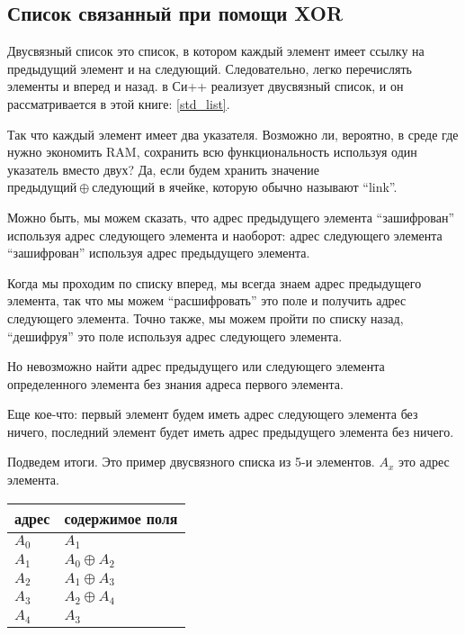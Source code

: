 \subsection{Список связанный при помощи XOR}

Двусвязный список это список, в котором каждый элемент имеет ссылку на предыдущий элемент и на следующий.
Следовательно, легко перечислять элементы и вперед и назад.
 в Си++ реализует двусвязный список, и он рассматривается в этой книге: \ref{std_list}.

Так что каждый элемент имеет два указателя.
Возможно ли, вероятно, в среде где нужно экономить \ac{RAM}, сохранить всю функциональность используя один указатель
вместо двух?
Да, если будем хранить значение $предыдущий \oplus следующий$ в ячейке, которую обычно называют ``link''.

Можно быть, мы можем сказать, что адрес предыдущего элемента ``зашифрован'' используя адрес следующего элемента и наоборот:
адрес следующего элемента ``зашифрован'' используя адрес предыдущего элемента.

Когда мы проходим по списку вперед, мы всегда знаем адрес предыдущего элемента, так что мы можем ``расшифровать'' это поле
и получить адрес следующего элемента.
Точно также, мы можем пройти по списку назад, ``дешифруя'' это поле используя адрес следующего элемента.

Но невозможно найти адрес предыдущего или следующего элемента определенного элемента без знания адреса первого элемента.

Еще кое-что: первый элемент будем иметь адрес следующего элемента без ничего,
последний элемент будет иметь адрес предыдущего элемента без ничего.

Подведем итоги. Это пример двусвязного списка из 5-и элементов.
$A_x$ это адрес элемента.

\begin{center}
\begin{tabular}{ | l | l | }
	\hline
	\HeaderColor адрес & \HeaderColor содержимое поля \IT{link} \\
	\hline
	$A_0$ & $A_1$ \\
	\hline
	$A_1$ & $A_0 \oplus A_2$ \\
	\hline
	$A_2$ & $A_1 \oplus A_3$ \\
	\hline
	$A_3$ & $A_2 \oplus A_4$ \\
	\hline
	$A_4$ & $A_3$ \\
	\hline
\end{tabular}
\end{center}

